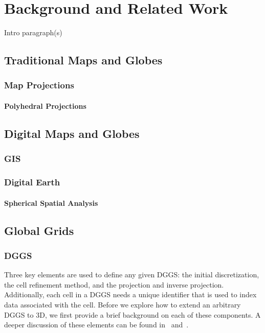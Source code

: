 \chapter{Background and Related Work}

Intro paragraph(s)

\section{Traditional Maps and Globes}

\subsection{Map Projections}

\subsubsection{Polyhedral Projections}




\section{Digital Maps and Globes}

\subsection{GIS}

\subsection{Digital Earth}

\subsubsection{Spherical Spatial Analysis}




\section{Global Grids}

\subsection{DGGS} \label{sec:dggs}
Three key elements are used to define any given DGGS: the initial discretization, the cell refinement method, and the projection and inverse projection.
Additionally, each cell in a DGGS needs a unique identifier that is used to index data associated with the cell.
Before we explore how to extend an arbitrary DGGS to 3D, we first provide a brief background on each of these components.
A deeper discussion of these elements can be found in~\cite{mahdavi2015survey} and~\cite{alderson2020digital}.


